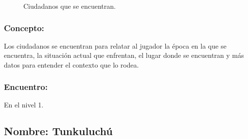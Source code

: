 \documentclass[11pt,letterpaper]{article}
\begin{document}
\begin{figure}
	\caption{Ciudadanos que se encuentran.}
	\label{fig:Ciudadanos}
\end{figure} 
\subsubsection{Concepto:}
Los ciudadanos se encuentran para relatar al jugador la época en la que se encuentra, la situación actual que enfrentan, el lugar donde se encuentran y más datos para entender el contexto que lo rodea.
\subsubsection{Encuentro:}
En el nivel 1.
\subsection{Nombre: Tunkuluchú}   \label{per.tecolote}
\end{document}
